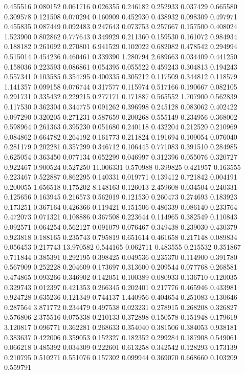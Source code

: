 0.455516
0.080152
0.061716
0.026355
0.246182
0.252933
0.037429
0.665580
0.309578
0.121508
0.070294
0.160909
0.452930
0.438932
0.098309
0.497971
0.455835
0.087449
0.092483
0.247643
0.073753
0.257667
0.157500
0.408024
1.523900
0.802862
0.777643
0.349929
0.211360
0.159530
0.161072
0.984934
0.188182
0.261092
0.270801
6.941529
0.102022
0.682082
0.478542
0.294994
0.515014
0.454236
0.460461
0.339390
1.280794
2.689663
0.034409
0.441250
0.158036
0.223593
0.086861
0.054395
0.055522
0.459243
0.304813
0.194243
0.557341
0.103585
0.354795
0.400335
0.305212
0.117509
0.344812
0.118579
1.141357
0.099158
0.076744
0.317577
0.115974
0.517166
0.190667
0.082105
0.291731
0.335432
0.229215
0.277171
0.171887
0.565552
1.707900
0.562839
0.117530
0.362304
0.344775
0.091262
0.396998
0.245128
0.083062
0.402422
0.097290
0.320205
0.271231
0.587659
0.200268
0.555149
0.234956
0.368002
0.598964
0.261363
0.395230
0.051680
0.240118
0.432204
0.212520
0.210969
0.084862
0.664782
0.264192
0.161773
0.211824
0.191694
0.109054
0.076040
0.281179
0.202281
0.357299
0.346712
0.106445
0.771083
0.391510
0.284985
0.625054
0.363450
0.077134
0.652299
0.046997
0.312396
0.055076
0.320727
0.922467
0.900524
0.527250
11.006331
0.570988
0.399825
0.421957
0.163555
0.223467
0.522887
0.862295
0.140331
0.019771
0.139412
0.721842
0.004191
0.200055
1.656518
0.175202
8.148163
0.126013
2.459608
0.034504
0.240331
0.125656
0.163945
0.216573
0.562019
0.121530
0.260473
0.274693
0.183923
0.173251
0.367164
0.426366
0.119421
0.151506
0.486339
0.086140
0.233764
0.472073
0.071321
0.108886
0.367508
0.223644
0.114965
0.382549
0.110843
0.092571
0.064254
0.562127
0.091079
0.076467
0.349438
0.239030
0.430379
0.923818
0.188165
0.235743
0.795819
0.651614
0.461658
0.217148
0.089834
0.056453
0.217743
13.970582
0.544165
0.062711
0.483555
0.215532
0.351867
0.711844
0.385391
0.292195
0.398425
0.049536
0.235370
0.114900
0.391780
0.567909
0.252228
0.204609
0.173697
0.313600
0.209544
0.077768
0.268581
0.474865
0.093266
0.346902
0.142051
0.100389
0.080933
0.136710
0.120035
0.329743
0.012397
0.421353
0.266345
0.202401
0.217776
0.465946
0.433981
0.924728
0.635236
0.121349
0.744137
1.440956
0.404654
0.251083
0.130646
0.287564
3.871772
0.234479
0.497538
0.023231
0.278915
0.268208
0.326827
0.576806
2.375516
0.075338
0.210133
0.372898
0.150578
0.151948
0.179619
3.120817
0.096771
0.362281
0.268633
0.354040
0.381506
0.384053
0.938181
0.383637
0.422006
0.359053
0.152327
0.182352
0.299284
0.187908
0.549061
0.066218
0.485392
0.034309
0.222601
0.613258
0.342542
0.128293
0.173139
0.210795
0.510271
0.551076
0.157302
0.099944
0.369070
0.668660
0.103209
0.559791
